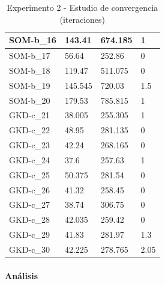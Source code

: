 \documentclass[11pt,a4paper]{article}
\begin{document}
\begin{center}
\begin{table}[H]
\begin{tabular}{l|l|l|l|}
				\multicolumn{1}{|l|}{SOM-b\_16} & 143.41         & 674.185         & 1             \\ \hline
				\multicolumn{1}{|l|}{SOM-b\_17} & 56.64          & 252.86          & 0             \\ \hline
				\multicolumn{1}{|l|}{SOM-b\_18} & 119.47         & 511.075         & 0             \\ \hline
				\multicolumn{1}{|l|}{SOM-b\_19} & 145.545        & 720.03          & 1.5           \\ \hline
				\multicolumn{1}{|l|}{SOM-b\_20} & 179.53         & 785.815         & 1             \\ \hline
				\multicolumn{1}{|l|}{GKD-c\_21} & 38.005         & 255.305         & 1             \\ \hline
				\multicolumn{1}{|l|}{GKD-c\_22} & 48.95          & 281.135         & 0             \\ \hline
				\multicolumn{1}{|l|}{GKD-c\_23} & 42.24          & 268.165         & 0             \\ \hline
				\multicolumn{1}{|l|}{GKD-c\_24} & 37.6           & 257.63          & 1             \\ \hline
				\multicolumn{1}{|l|}{GKD-c\_25} & 50.375         & 281.54          & 0             \\ \hline
				\multicolumn{1}{|l|}{GKD-c\_26} & 41.32          & 258.45          & 0             \\ \hline
				\multicolumn{1}{|l|}{GKD-c\_27} & 38.74          & 306.75          & 0             \\ \hline
				\multicolumn{1}{|l|}{GKD-c\_28} & 42.035         & 259.42          & 0             \\ \hline
				\multicolumn{1}{|l|}{GKD-c\_29} & 41.83          & 281.97          & 1.3           \\ \hline
				\multicolumn{1}{|l|}{GKD-c\_30} & 42.225         & 278.765         & 2.05          \\ \hline
			\end{tabular}
			\caption{ Experimento 2 - Estudio de convergencia (iteraciones) }
			\label{iteraciones}	
		\end{table}
	\end{center}

	\paragraph{ Análisis } \ \\
	
\end{document}
